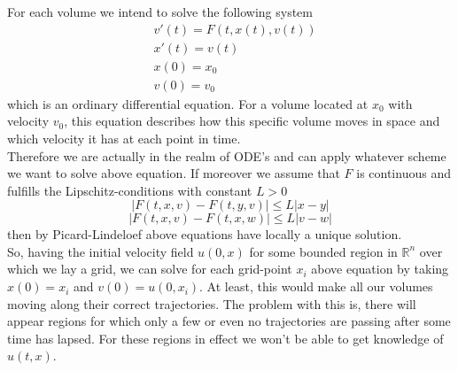 \documentclass[17pt]{extarticle}
\begin{document}
For each volume we intend to solve the following system
\begin{align*}
	&v'(t)=F(t,x(t),v(t))\\
	&x'(t)=v(t)\\
	&x(0)=x_0\\
	&v(0)=v_0
\end{align*}
which is an ordinary differential equation. For a volume located at $x_0$ with velocity $v_0$, this equation describes how this specific volume moves in space and which velocity it has at each point in time.\\
Therefore we are actually in the realm of ODE's and can apply whatever scheme we want to solve above equation.
If moreover we assume that $F$ is continuous and fulfills the Lipschitz-conditions
with constant $L>0$
$$
|F(t,x,v)-F(t,y,v)|\leq L|x-y|
$$
$$
|F(t,x,v)-F(t,x,w)|\leq L|v-w|
$$
then by Picard-Lindeloef above equations have locally a unique solution.\\
So, having the initial velocity field $u(0, x)$ for some bounded region in $\mathbb{R}^n$ over which we lay a grid, we can solve for each grid-point $x_i$ above equation by taking $x(0)=x_i$ and $v(0)=u(0, x_i)$. At least, this would make all our volumes moving along their correct trajectories. The problem with this is, there will appear regions for which only a few or even no trajectories are passing after some time has lapsed. For these regions in effect we won't be able to get knowledge of $u(t,x)$.
\end{document}
